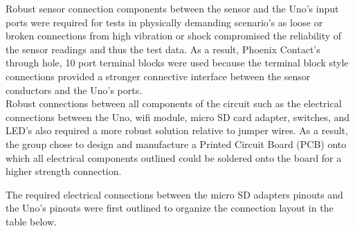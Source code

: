 \documentclass[12pt, titlepage]{article}
\begin{document}
Robust sensor connection components between the sensor and the Uno's input ports were required for tests in physically demanding scenario's as loose or broken connections from high vibration or shock compromised the reliability of the sensor readings and thus the test data. As a result, Phoenix Contact's through hole, 10 port terminal blocks were used because the terminal block style connections provided a stronger connective interface between the sensor conductors and the Uno's ports. \\

Robust connections between all components of the circuit such as the electrical connections between the Uno, wifi module, micro SD card adapter, switches, and LED's also required a more robust solution relative to jumper wires. As a result, the group chose to design and manufacture a Printed Circuit Board (PCB) onto which all electrical components outlined could be soldered onto the board for a higher strength connection. \\
\newpage

The required electrical connections between the micro SD adapters pinouts and the Uno's pinouts were first outlined to organize the connection layout in the table below. \\
\end{document}
